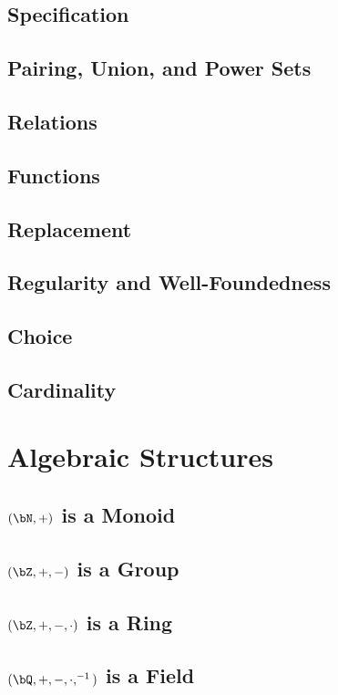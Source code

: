 \section{Specification}
\section{Pairing, Union, and Power Sets}
\section{Relations}
\section{Functions}
\section{Replacement}
\section{Regularity and Well-Foundedness}
\section{Choice}
\section{Cardinality}
\chapter{Algebraic Structures}
\section{$(\bN, +)$ is a Monoid}
\section{$(\bZ, +, -)$ is a Group}
\section{$(\bZ, +, -, \cdot)$ is a Ring}
\section{$(\bQ, +, -, \cdot, ^{-1})$ is a Field}
